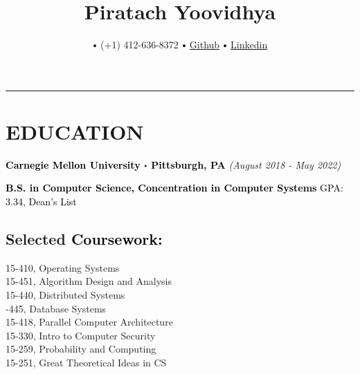 \documentclass[10pt]{article}
\title{\bfseries\Huge Piratach Yoovidhya}
\author{
  \small \myemail
   $\sbullet[.75]$
   (+1) 412-636-8372
   $\sbullet[.75]$
  \href{https://github.com/Piratach}{Github}
   $\sbullet[.75]$
  \href{https://www.linkedin.com/in/piratach-yoovidhya/}
{Linkedin}
}
\date{}
\newcommand\sbullet[1][.5]{\mathbin{\vcenter{\hbox{\scalebox{#1}{$\bullet$}}}}}
\begin{document}
  \maketitle
  \thispagestyle{empty}
  \vspace*{-1.0cm}
  \hrule
  \vspace*{-0.15cm}

  \section*{\large \textcolor{lighterB}{EDUCATION}}
  \vspace*{-0.3cm}
  \textbf{\large \textcolor{Black}{Carnegie Mellon University $\sbullet$ Pittsburgh, PA}} \hfill \textit{(August 2018 - May 2022)}

  \vspace{0.05cm}

  \textcolor{Black}{\textbf{B.S. in Computer Science, Concentration in Computer Systems} \hfill GPA: 3.34, Dean's List}

  \vspace{0.2cm}

  \vspace*{-0.5cm}

  \subsection*{Selected \textcolor{Black}{Coursework:}}

    \vspace*{-0.55cm}
    \begin{multicols}{2}
       15-410, Operating Systems \\
       15-451, Algorithm Design and Analysis \\
       15-440, Distributed Systems \\
       -445, Database Systems \\
       15-418, Parallel Computer Architecture \\
       15-330, Intro to Computer Security \\
       15-259, Probability and Computing \\
       15-251, Great Theoretical Ideas in CS
    \end{multicols}
\end{document}
